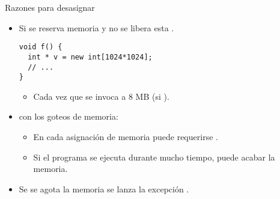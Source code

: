 \begin{frame}[t,fragile]{Razones para desasignar}
\begin{itemize}
  \item Si se reserva memoria y no se libera esta .
\begin{lstlisting}
void f() {
  int * v = new int[1024*1024];
  // ...
}
\end{lstlisting}
    \begin{itemize}
      \item Cada vez que se invoca a   8 MB 
            (si ).
    \end{itemize}

  \item {} con los goteos de memoria:
    \begin{itemize}
      \item En cada asignación de memoria puede requerirse .
      \item Si el programa se ejecuta durante mucho tiempo, 
            puede acabar  la memoria.
    \end{itemize}

  \item Se se agota la memoria se lanza la excepción .
\end{itemize}
\end{frame}

